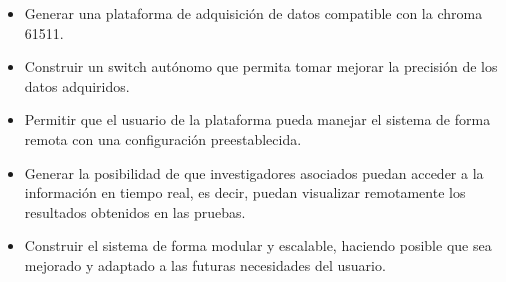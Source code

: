 \begin{itemize}

\item Generar una plataforma de adquisición de datos compatible con la chroma 61511.   

\item Construir un switch autónomo que permita tomar mejorar la precisión de los datos adquiridos. 

\item Permitir que el usuario de la plataforma pueda manejar el sistema de forma remota con una configuración preestablecida.

\item Generar la posibilidad de que investigadores asociados puedan acceder a la información en tiempo real, es decir, puedan visualizar remotamente los resultados obtenidos en las pruebas.

\item Construir el sistema de forma modular y escalable, haciendo posible que sea mejorado y adaptado a las futuras necesidades del usuario. 

\end{itemize}








